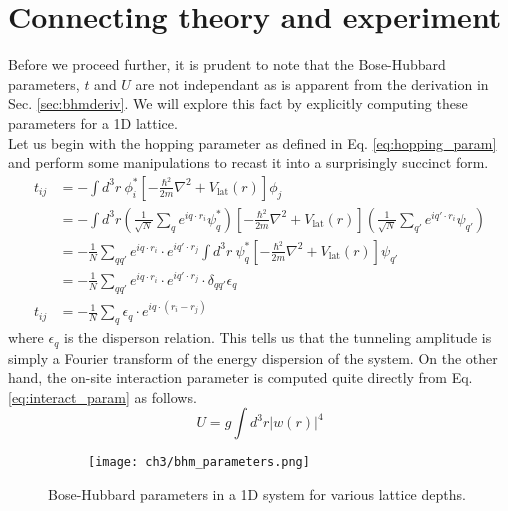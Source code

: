 \section{Connecting theory and experiment}\label{sec:calc_params}
Before we proceed further, it is prudent to note that the Bose-Hubbard parameters, $t$ and $U$ are not independant as is apparent from the derivation in Sec. \ref{sec:bhmderiv}. We will explore this fact by explicitly computing these parameters for a 1D lattice. 
\vspace{0.5cm}\\
Let us begin with the hopping parameter as defined in Eq. \eqref{eq:hopping_param} and perform some manipulations to recast it into a surprisingly succinct form.
\begin{align}
    t_{ij} &= -\int d^3r \ \phi_i^* \left [ -\frac{\hbar^2}{2m}\nabla^2 + V_{\text{lat}}(r) \right ] \phi_j \nonumber\\ 
    &= -\int d^3r \left (\frac{1}{\sqrt{N}} \sum_{q} e^{iq\cdot r_i} \psi_q^* \right ) \left [ -\frac{\hbar^2}{2m}\nabla^2 + V_{\text{lat}}(r) \right ] \left (\frac{1}{\sqrt{N}} \sum_{q'} e^{iq'\cdot r_i} \psi_{q'}\right ) \nonumber\\ 
    &= -\frac{1}{N}\sum_{q q'} e^{iq \cdot r_i} \cdot e^{iq' \cdot r_j} \int d^3r \ \psi_q^* \left [ -\frac{\hbar^2}{2m}\nabla^2 + V_{\text{lat}}(r)\right ] \psi_{q'} \nonumber\\
    &=  -\frac{1}{N}\sum_{q q'} e^{iq \cdot r_i} \cdot e^{iq' \cdot r_j} \cdot \delta_{q q'} \epsilon_{q} \nonumber \\
    t_{ij}&= -\frac{1}{N}\sum_{q} \epsilon_{q} \cdot e^{i q \cdot (r_i - r_j)}
\end{align}
where $\epsilon_q$ is the disperson relation. This tells us that the tunneling amplitude is simply a Fourier transform of the energy dispersion of the system. On the other hand, the on-site interaction parameter is computed quite directly from Eq. \eqref{eq:interact_param} as follows.
\begin{equation}
    U = g\int d^3r |w(r)|^4    
\end{equation}

\begin{figure}[!htb]
    \centering
    \begin{subfigure}[b]{\textwidth}  %
        \centering
        \texttt{[image: ch3/bhm\_parameters.png]}
    \end{subfigure}
    \caption{Bose-Hubbard parameters in a 1D system for various lattice depths.}
    \label{fig:bhm_param}
\end{figure}
\FloatBarrier \!\!\!\!\!\!\!\!\!\!\!

